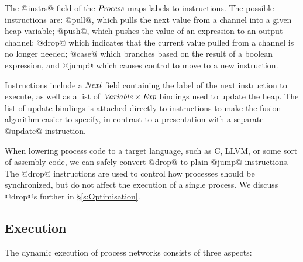 The @instrs@ field of the $\textit{Process}$ maps labels to instructions. The possible instructions are: @pull@, which pulls the next value from a channel into a given heap variable; @push@, which pushes the value of an expression to an output channel;  @drop@ which indicates that the current value pulled from a channel is no longer needed; @case@ which branches based on the result of a boolean expression, and @jump@ which causes control to move to a new instruction.

Instructions include a $\textit{Next}$ field containing the label of the next instruction to execute, as well as a list of $\textit{Variable} \times \textit{Exp}$ bindings used to update the heap.
The list of update bindings is attached directly to instructions to make the fusion algorithm easier to specify, in contrast to a presentation with a separate @update@ instruction. 

When lowering process code to a target language, such as C, LLVM, or some sort of assembly code, we can safely convert @drop@ to plain @jump@ instructions. The @drop@ instructions are used to control how processes should be synchronized, but do not affect the execution of a single process. We discuss @drop@s further in \S\ref{s:Optimisation}.




\subsection{Execution}
\label{s:Process:Eval}

The dynamic execution of process networks consists of three aspects:

